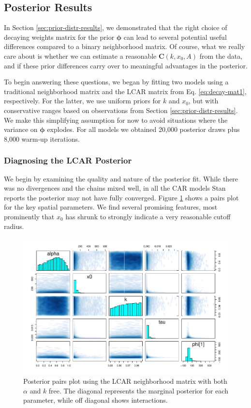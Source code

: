 \documentclass{scrartcl}
\newcommand{\mat}[1]{\bm{#1}}
\begin{document}
\subsection{Posterior Results}
\label{sec:posterior-results}

In Section \ref{sec:prior-distr-results}, we demonstrated that the
right choice of decaying weights matrix for the prior $\mat{\phi}$ can
lead to several potential useful differences compared to a binary
neighborhood matrix. Of course, what we really care about is whether
we can estimate a reasonable $\mat{C}(k, x_0, A)$ from the data, and
if these prior differences carry over to meaningful advantages in the
posterior.

To begin answering these questions, we began by fitting two models
using a traditional neighborhood matrix and the LCAR matrix from
Eq. \eqref{eq:decay-mat1}, respectively. For the latter, we use
uniform priors for $k$ and $x_0$, but with conservative ranges based
on observations from Section \ref{sec:prior-distr-results}. We make
this simplifying assumption for now to avoid situations where the
variance on $\mat{\phi}$ explodes. For all models we obtained 20,000
posterior draws plus 8,000 warm-up iterations.

\subsubsection{Diagnosing the LCAR Posterior}
\label{sec:diagn-lcar-post}

We begin by examining the quality and nature of the posterior
fit. While there was no divergences and the chains mixed well, in all
the CAR models Stan reports the posterior may not have fully
converged. Figure \ref{fig:pairs-full} shows a pairs plot for the key
spatial parameters. We find several promising features, most
prominently that $x_0$ has shrunk to strongly indicate a very
reasonable cutoff radius.

\begin{figure}
  \centering
  \includegraphics[width=.9\linewidth]{pairs-full}
  \caption{Posterior pairs plot using the LCAR neighborhood matrix
    with both $\alpha$ and $k$ free. The diagonal represents the
    marginal posterior for each parameter, while off diagonal shows
    interactions.}
  \label{fig:pairs-full}
\end{figure}
\end{document}
